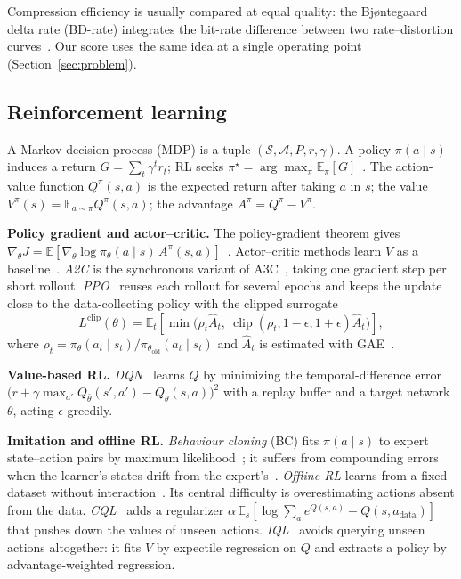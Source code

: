 \documentclass[conference]{IEEEtran}
\begin{document}
Compression efficiency is usually compared at equal quality: the Bj{\o}ntegaard delta rate (BD-rate) integrates the bit-rate difference between two rate--distortion curves~\cite{bjontegaard2001}. Our score uses the same idea at a single operating point (Section~\ref{sec:problem}).

\subsection{Reinforcement learning}
A Markov decision process (MDP) is a tuple $(\mathcal{S},\mathcal{A},P,r,\gamma)$. A policy $\pi(a\mid s)$ induces a return $G = \sum_t \gamma^t r_t$; RL seeks $\pi^\star = \arg\max_\pi \mathbb{E}_\pi[G]$~\cite{sutton2018rl}. The action-value function $Q^\pi(s,a)$ is the expected return after taking $a$ in $s$; the value $V^\pi(s) = \mathbb{E}_{a\sim\pi}Q^\pi(s,a)$; the advantage $A^\pi = Q^\pi - V^\pi$.

\textbf{Policy gradient and actor--critic.} The policy-gradient theorem gives $\nabla_\theta J = \mathbb{E}[\nabla_\theta \log \pi_\theta(a\mid s)\, A^\pi(s,a)]$~\cite{williams1992reinforce,sutton2018rl}. Actor--critic methods learn $V$ as a baseline~\cite{konda2000actorcritic}. \emph{A2C} is the synchronous variant of A3C~\cite{mnih2016a3c}, taking one gradient step per short rollout. \emph{PPO}~\cite{schulman2017ppo} reuses each rollout for several epochs and keeps the update close to the data-collecting policy with the clipped surrogate
\begin{equation}
L^{\text{clip}}(\theta)=\mathbb{E}_t\!\left[\min\!\big(\rho_t \hat A_t,\ \operatorname{clip}(\rho_t,1{-}\epsilon,1{+}\epsilon)\hat A_t\big)\right],
\end{equation}
where $\rho_t = \pi_\theta(a_t\mid s_t)/\pi_{\theta_{\text{old}}}(a_t\mid s_t)$ and $\hat A_t$ is estimated with GAE~\cite{schulman2016gae}.

\textbf{Value-based RL.} \emph{DQN}~\cite{mnih2015dqn} learns $Q$ by minimizing the temporal-difference error $\big(r + \gamma \max_{a'} Q_{\bar\theta}(s',a') - Q_\theta(s,a)\big)^2$ with a replay buffer and a target network $\bar\theta$, acting $\epsilon$-greedily.

\textbf{Imitation and offline RL.} \emph{Behaviour cloning} (BC) fits $\pi(a\mid s)$ to expert state--action pairs by maximum likelihood~\cite{pomerleau1989alvinn}; it suffers from compounding errors when the learner's states drift from the expert's~\cite{ross2011dagger}. \emph{Offline RL} learns from a fixed dataset without interaction~\cite{levine2020offline}. Its central difficulty is overestimating actions absent from the data. \emph{CQL}~\cite{kumar2020cql} adds a regularizer $\alpha\,\mathbb{E}_s[\log\sum_a e^{Q(s,a)} - Q(s,a_{\text{data}})]$ that pushes down the values of unseen actions. \emph{IQL}~\cite{kostrikov2022iql} avoids querying unseen actions altogether: it fits $V$ by expectile regression on $Q$ and extracts a policy by advantage-weighted regression.
\end{document}
